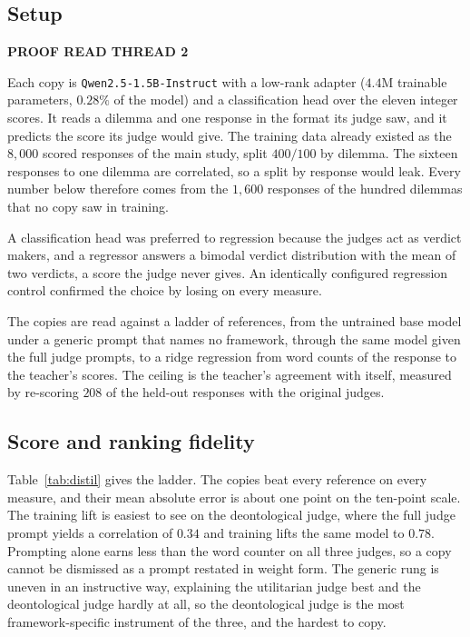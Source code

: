 \documentclass[10pt,twocolumn,a4paper]{article}
\begin{document}
\subsection{Setup}

\textbf{PROOF READ THREAD 2}

Each copy is \texttt{Qwen2.5-1.5B-Instruct} with a low-rank adapter
($4.4$M trainable parameters, $0.28\%$ of the model) and a
classification head over the eleven integer scores. It reads a dilemma
and one response in the format its judge saw, and it predicts the score
its judge would give. The training data already existed as the $8{,}000$
scored responses of the main study, split $400/100$ by dilemma. The
sixteen responses to one dilemma are correlated, so a split by response
would leak. Every number below therefore comes from the $1{,}600$
responses of the hundred dilemmas that no copy saw in training.

A classification head was preferred to regression because the judges
act as verdict makers, and a regressor answers a bimodal verdict
distribution with the mean of two verdicts, a score the judge never
gives. An identically configured regression control confirmed the
choice by losing on every measure.

The copies are read against a ladder of references, from the untrained
base model under a generic prompt that names no framework, through the
same model given the full judge prompts, to a ridge regression from
word counts of the response to the teacher's scores. The ceiling is the
teacher's agreement with itself, measured by re-scoring $208$ of the
held-out responses with the original judges.

\subsection{Score and ranking fidelity}

Table~\ref{tab:distil} gives the ladder. The copies beat every reference
on every measure, and their mean absolute error is about one point on
the ten-point scale. The training lift is easiest to see on the
deontological judge, where the full judge prompt yields a correlation
of $0.34$ and training lifts the same model to $0.78$. Prompting alone
earns less than the word counter on all three judges, so a copy cannot
be dismissed as a prompt restated in weight form. The generic rung is
uneven in an instructive way, explaining the utilitarian judge best and
the deontological judge hardly at all, so the deontological judge is
the most framework-specific instrument of the three, and the hardest to
copy.
\end{document}
